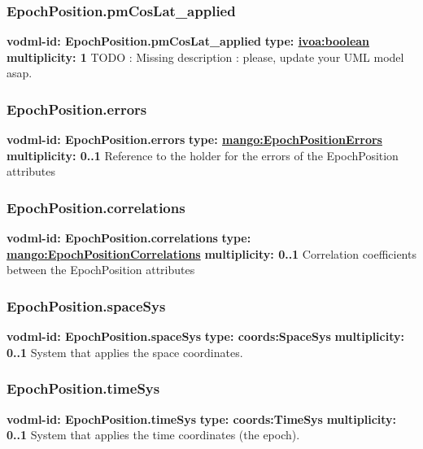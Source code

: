     \subsubsection{EpochPosition.pmCosLat\_applied}
      \textbf{vodml-id: EpochPosition.pmCosLat\_applied} \newline
      \textbf{type: \hyperref[sect:ivoa]{ivoa:boolean}} \newline
      \textbf{multiplicity: 1} \newline 
      TODO : Missing description : please, update your UML model asap.

    \subsubsection{EpochPosition.errors}
      \textbf{vodml-id: EpochPosition.errors} \newline
      \textbf{type: \hyperref[sect:EpochPositionErrors]{mango:EpochPositionErrors}} \newline
      \textbf{multiplicity: 0..1} \newline 
      Reference to the holder for the errors of the EpochPosition attributes

    \subsubsection{EpochPosition.correlations}
      \textbf{vodml-id: EpochPosition.correlations} \newline
      \textbf{type: \hyperref[sect:EpochPositionCorrelations]{mango:EpochPositionCorrelations}} \newline
      \textbf{multiplicity: 0..1} \newline 
      Correlation coefficients between the EpochPosition attributes

    \subsubsection{EpochPosition.spaceSys}
      \textbf{vodml-id: EpochPosition.spaceSys} \newline
      \textbf{type: coords:SpaceSys} \newline
      \textbf{multiplicity: 0..1} \newline 
      System that applies the space coordinates.

    \subsubsection{EpochPosition.timeSys}
      \textbf{vodml-id: EpochPosition.timeSys} \newline
      \textbf{type: coords:TimeSys} \newline
      \textbf{multiplicity: 0..1} \newline 
      System that applies the time coordinates (the epoch).

